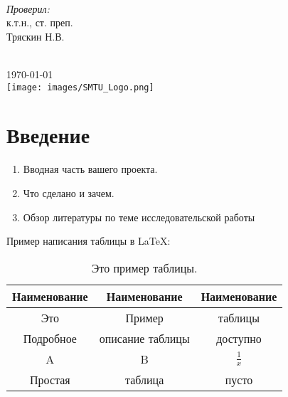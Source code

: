 \documentclass[11pt]{article}
\begin{document}
\begin{titlepage}
\begin{minipage}{0.4\textwidth}
\begin{flushleft} \large
\end{flushleft}
\end{minipage}
~ 
\begin{minipage}{0.4\textwidth}
\begin{flushright} \large
\emph{Проверил:} \\
к.т.н., ст. преп.\\
Тряскин \textsc{Н.В.} 
\end{flushright}
\end{minipage}\\[2cm] 
 


{\large \today}\\[0.5cm] %

\texttt{[image: images/SMTU\_Logo.png]}
 
\vfill %
\end{titlepage} %


\section{Введение}\label{sec:Introduction}
	\begin{enumerate}
		\item Вводная часть вашего проекта.
		\item Что сделано и зачем.
		\item Обзор литературы по теме исследовательской работы
	\end{enumerate}

Пример написания таблицы в \LaTeX:
\begin{table}[htb]
\centering
\caption{Это пример таблицы.}
\label{Tab:TabExample} %
\begin{tabular}{c|c|c} %
\textbf{Наименование} & \textbf{Наименование} & \textbf{Наименование} \\
\hline
Это	&	Пример	&	таблицы  \\
\hline
Подробное	&	описание таблицы	& доступно   \\
\hline
A	&	B	& $\frac{1}{x}$ \\
\hline
Простая	&	таблица	& пусто \\
\hline
\end{tabular}
\end{table}
\end{document}
